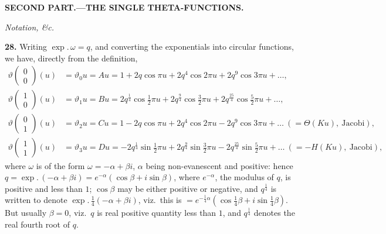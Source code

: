 \documentclass[11pt]{article}
\begin{document}
\bigskip

\begin{center}\textbf{SECOND PART.---THE SINGLE THETA-FUNCTIONS.}\end{center}

\medskip

\textit{Notation, \&c.}

\medskip

\textbf{28.} Writing $\exp.\,\omega = q$, and converting the exponentials into circular functions, we have, directly from the definition,
\begin{align*}
\vartheta\!\begin{pmatrix} 0 \\ 0 \end{pmatrix}\!(u) &= \vartheta_0 u = Au = 1 + 2q\cos\pi u + 2q^4\cos 2\pi u + 2q^9\cos 3\pi u + \ldots,\\
\vartheta\!\begin{pmatrix} 1 \\ 0 \end{pmatrix}\!(u) &= \vartheta_1 u = Bu = 2q^{\tfrac{1}{4}}\cos\tfrac{1}{2}\pi u + 2q^{\tfrac{9}{4}}\cos\tfrac{3}{2}\pi u + 2q^{\tfrac{25}{4}}\cos\tfrac{5}{2}\pi u + \ldots,\\
\vartheta\!\begin{pmatrix} 0 \\ 1 \end{pmatrix}\!(u) &= \vartheta_2 u = Cu = 1 - 2q\cos\pi u + 2q^4\cos 2\pi u - 2q^9\cos 3\pi u + \ldots\ (= \Theta(Ku),\ \text{Jacobi}),\\
\vartheta\!\begin{pmatrix} 1 \\ 1 \end{pmatrix}\!(u) &= \vartheta_3 u = Du = -2q^{\tfrac{1}{4}}\sin\tfrac{1}{2}\pi u + 2q^{\tfrac{9}{4}}\sin\tfrac{3}{2}\pi u - 2q^{\tfrac{25}{4}}\sin\tfrac{5}{2}\pi u + \ldots\ (= -H(Ku),\ \text{Jacobi}),
\end{align*}
where $\omega$ is of the form $\omega = -\alpha + \beta i$, $\alpha$ being non-evanescent and positive: hence $q = \exp.\,(-\alpha + \beta i) = e^{-\alpha}(\cos\beta + i\sin\beta)$, where $e^{-\alpha}$, the modulus of $q$, is positive and less than $1$; $\cos\beta$ may be either positive or negative, and $q^{\tfrac{1}{4}}$ is written to denote $\exp.\,\tfrac{1}{4}(-\alpha + \beta i)$, viz.\ this is $= e^{-\tfrac{1}{4}\alpha}(\cos\tfrac{1}{4}\beta + i\sin\tfrac{1}{4}\beta)$. But usually $\beta = 0$, viz.\ $q$ is real positive quantity less than $1$, and $q^{\tfrac{1}{4}}$ denotes the real fourth root of $q$.
\end{document}
